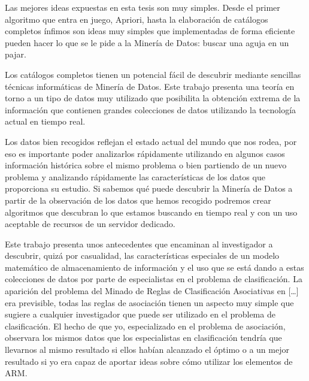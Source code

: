 \noindent Las mejores ideas expuestas en esta tesis son muy simples. Desde el primer algoritmo que entra en juego, Apriori, hasta la elaboración de catálogos completos ínfimos son ideas muy simples que implementadas de forma eficiente pueden hacer lo que se le pide a la Minería de Datos: buscar una aguja en un pajar.

Los catálogos completos tienen un potencial fácil de descubrir mediante sencillas técnicas informáticas de Minería de Datos. Este trabajo presenta una teoría en torno a un tipo de datos muy utilizado que posibilita la obtención extrema de la información que contienen grandes colecciones de datos utilizando la tecnología actual en tiempo real. 

Los datos bien recogidos reflejan el estado actual del mundo que nos rodea, por eso es importante poder analizarlos rápidamente utilizando en algunos casos información histórica sobre el mismo problema o bien partiendo de un nuevo problema y analizando rápidamente las características de los datos que proporciona su estudio. Si sabemos qué puede descubrir la Minería de Datos a partir de la observación de los datos que hemos recogido podremos crear algoritmos que descubran lo que estamos buscando en tiempo real y con un uso aceptable de recursos de un servidor dedicado.

Este trabajo presenta unos antecedentes que encaminan al investigador a descubrir, quizá por casualidad, las características especiales de un modelo matemático de almacenamiento de información y el uso que se está dando a estas colecciones de datos por parte de especialistas en el problema de clasificación. La aparición del problema del Minado de Reglas de Clasificación Asociativas en [\ldots] era previsible, todas las reglas de asociación tienen un aspecto muy simple que sugiere a cualquier investigador que puede ser utilizado en el problema de clasificación. El hecho de que yo, especializado en el problema de asociación, observara los mismos datos que los especialistas en clasificación tendría que llevarnos al mismo resultado si ellos habían alcanzado el óptimo o a un mejor resultado si yo era capaz de aportar ideas sobre cómo utilizar los elementos de ARM.

